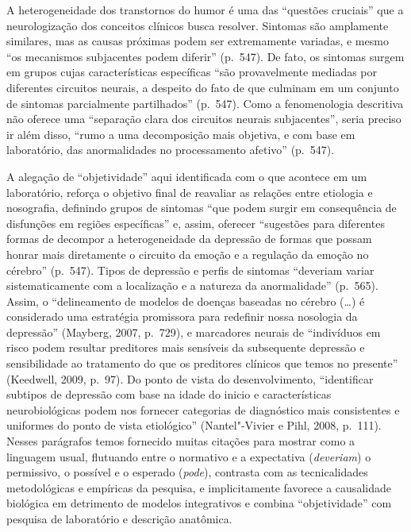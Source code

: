 A heterogeneidade dos transtornos do humor é uma das ``questões
cruciais'' que a neurologização dos conceitos clínicos busca resolver.
Sintomas são amplamente similares, mas as causas próximas podem ser
extremamente variadas, e mesmo ``os mecanismos subjacentes podem
diferir'' (p.~547). De fato, os sintomas surgem em grupos cujas
características específicas ``são provavelmente mediadas por diferentes
circuitos neurais, a despeito do fato de que culminam em um conjunto de
sintomas parcialmente partilhados'' (p.~547). Como a fenomenologia
descritiva não oferece uma ``separação clara dos circuitos neurais
subjacentes'', seria preciso ir além disso, ``rumo a uma decomposição
mais objetiva, e com base em laboratório, das anormalidades no
processamento afetivo'' (p.~547).

A alegação de ``objetividade'' aqui identificada com o que acontece em
um laboratório, reforça o objetivo final de reavaliar as relações entre
etiologia e nosografia, definindo grupos de sintomas ``que podem surgir
em consequência de disfunções em regiões específicas'' e, assim,
oferecer ``sugestões para diferentes formas de decompor a
heterogeneidade da depressão de formas que possam honrar mais
diretamente o circuito da emoção e a regulação da emoção no cérebro''
(p.~547). Tipos de depressão e perfis de sintomas ``deveriam variar
sistematicamente com a localização e a natureza da anormalidade''
(p.~565). Assim, o ``delineamento de modelos de doenças baseadas no
cérebro (\ldots{}) é considerado uma estratégia promissora para redefinir
nossa nosologia da depressão'' (Mayberg, 2007, p.~729), e marcadores
neurais de ``indivíduos em risco podem resultar preditores mais
sensíveis da subsequente depressão e sensibilidade ao tratamento do que
os preditores clínicos que temos no presente'' (Keedwell, 2009, p.~97).
Do ponto de vista do desenvolvimento, ``identificar subtipos de
depressão com base na idade do inicio e características neurobiológicas
podem nos fornecer categorias de diagnóstico mais consistentes e
uniformes do ponto de vista etiológico'' (Nantel"-Vivier e Pihl, 2008,
p.~111). Nesses parágrafos temos fornecido muitas citações para mostrar
como a linguagem usual, flutuando entre o normativo e a expectativa
(\emph{deveriam}) o permissivo, o possível e o esperado (\emph{pode}),
contrasta com as tecnicalidades metodológicas e empíricas da pesquisa, e
implicitamente favorece a causalidade biológica em detrimento de modelos
integrativos e combina ``objetividade'' com pesquisa de laboratório e
descrição anatômica.

